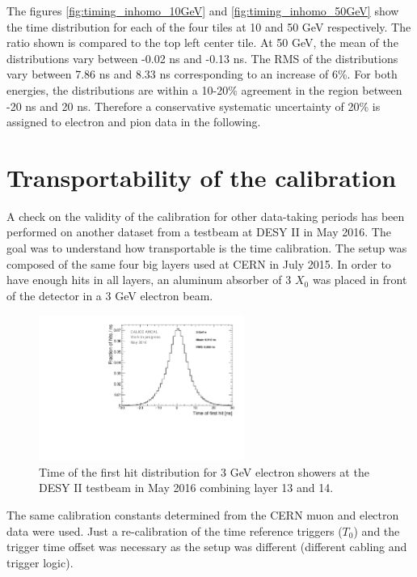 The figures \ref{fig:timing_inhomo_10GeV} and \ref{fig:timing_inhomo_50GeV} show the time distribution for each of the four tiles at 10 and 50 GeV respectively. The ratio shown is compared to the top left center tile. At 50 GeV, the mean of the distributions vary between -0.02 ns and -0.13 ns. The RMS of the distributions vary between 7.86 ns and 8.33 ns corresponding to an increase of 6\%. For both energies, the distributions are within a 10-20\% agreement in the region between -20 ns and 20 ns. Therefore a conservative systematic uncertainty of 20\% is assigned to electron and pion data in the following.

\section{Transportability of the calibration}

A check on the validity of the calibration for other data-taking periods has been performed on another dataset from a testbeam at DESY II in May 2016. The goal was to understand how transportable is the time calibration. The setup was composed of the same four big layers used at CERN in July 2015. In order to have enough hits in all layers, an aluminum absorber of 3 $X_{0}$ was placed in front of the detector in a 3 GeV electron beam.

\begin{figure}[htbp!]
	\centering
	\includegraphics[width=0.6\textwidth]{../Thesis_Plots/Timing/Electrons/Plots/Timing_May2016_BigLayers.pdf}
	\caption{Time of the first hit distribution for 3 GeV electron showers at the DESY II testbeam in May 2016 combining layer 13 and 14.}\label{fig:TBMay2016}
\end{figure}

The same calibration constants determined from the CERN muon and electron data were used. Just a re-calibration of the time reference triggers ($T_{0}$) and the trigger time offset was necessary as the setup was different (different cabling and trigger logic).

